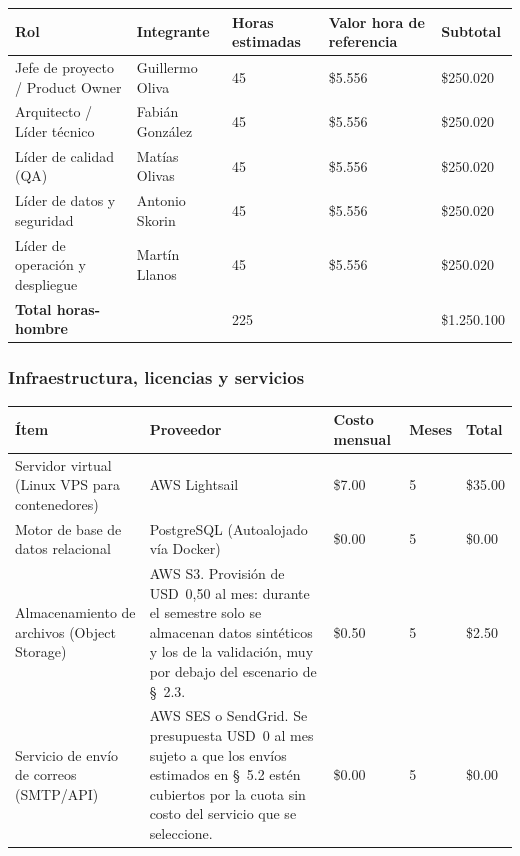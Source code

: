 \documentclass[10pt,a4paper]{article}
\newcommand{\hrow}{\rowcolor{encabezado}}
\newcommand{\h}[1]{\textbf{#1}}
\begin{document}
\begin{xltabular}{\linewidth}{|P{4.2cm}|L|P{2.4cm}|P{3.0cm}|P{2.2cm}|}
\hline\hrow \h{Rol} & \h{Integrante} & \h{Horas estimadas} & \h{Valor hora de referencia} & \h{Subtotal} \\ \hline
\endhead
Jefe de proyecto / Product Owner & Guillermo Oliva & 45 & \$5.556 & \$250.020 \\ \hline
Arquitecto / Líder técnico & Fabián González & 45 & \$5.556 & \$250.020 \\ \hline
Líder de calidad (QA) & Matías Olivas & 45 & \$5.556 & \$250.020 \\ \hline
Líder de datos y seguridad & Antonio Skorin & 45 & \$5.556 & \$250.020 \\ \hline
Líder de operación y despliegue & Martín Llanos & 45 & \$5.556 & \$250.020 \\ \hline
\textbf{Total horas-hombre} & & 225 &  & \$1.250.100 \\ \hline
\end{xltabular}

\subsubsection*{Infraestructura, licencias y servicios}
\begin{xltabular}{\linewidth}{|P{4.2cm}|L|P{2.4cm}|P{2.0cm}|P{2.4cm}|}
\hline\hrow \h{Ítem} & \h{Proveedor} & \h{Costo mensual} & \h{Meses} & \h{Total} \\ \hline
\endhead

Servidor virtual (Linux VPS para contenedores) & AWS Lightsail & \$7.00 & 5 & \$35.00 \\ \hline

Motor de base de datos relacional & PostgreSQL (Autoalojado vía Docker) & \$0.00 & 5 & \$0.00 \\ \hline

Almacenamiento de archivos (Object Storage) & AWS S3. Provisión de USD~0,50 al mes: durante el semestre solo se almacenan datos sintéticos y los de la validación, muy por debajo del escenario de \S~2.3. & \$0.50 & 5 & \$2.50 \\ \hline

Servicio de envío de correos (SMTP/API) & AWS SES o SendGrid. Se presupuesta USD~0 al mes sujeto a que los envíos estimados en \S~5.2 estén cubiertos por la cuota sin costo del servicio que se seleccione. & \$0.00 & 5 & \$0.00 \\ \hline

\end{xltabular}
\end{document}
